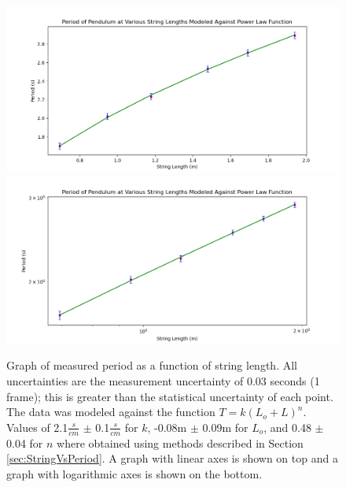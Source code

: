\documentclass[11pt]{article}
\begin{document}
        \begin{figure}[H]
            \includegraphics[width = \textwidth]{PowerFitLengths.png}
            \includegraphics[width = \textwidth]{LogFitForLengths.png}
            \caption{Graph of measured period as a function of string length. All uncertainties are the measurement uncertainty of 0.03 seconds (1 frame); this is greater than the statistical uncertainty of each point. The data was modeled against the function $T = k(L_o + L)^n$. Values of 2.1$\frac{s}{cm}$ $\pm$ 0.1$\frac{s}{cm}$ for $k$, -0.08m $\pm$ 0.09m for $L_o$, and 0.48 $\pm$ 0.04 for $n$ where obtained using methods described in Section \ref{sec:StringVsPeriod}. A graph with linear axes is shown on top and a graph with logarithmic axes is shown on the bottom.
            \label{fig:GraphedLengths}}
        \end{figure}
\end{document}
